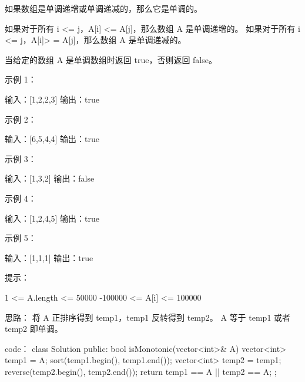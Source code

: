 如果数组是单调递增或单调递减的，那么它是单调的。

如果对于所有 i <= j，A[i] <= A[j]，那么数组 A 是单调递增的。 如果对于所有 i <= j，A[i]> = A[j]，那么数组 A 是单调递减的。

当给定的数组 A 是单调数组时返回 true，否则返回 false。

 

示例 1：

输入：[1,2,2,3]
输出：true

示例 2：

输入：[6,5,4,4]
输出：true

示例 3：

输入：[1,3,2]
输出：false

示例 4：

输入：[1,2,4,5]
输出：true

示例 5：

输入：[1,1,1]
输出：true

 

提示：

    1 <= A.length <= 50000
    -100000 <= A[i] <= 100000





















思路：
将 A 正排序得到 temp1，temp1 反转得到 temp2。 A 等于 temp1 或者 temp2 即单调。


























code：
class Solution {
public:
    bool isMonotonic(vector<int>& A) {
        vector<int> temp1 = A;
        sort(temp1.begin(), temp1.end());
        vector<int> temp2 = temp1;
        reverse(temp2.begin(), temp2.end());
        return temp1 == A || temp2 == A;
    }
};